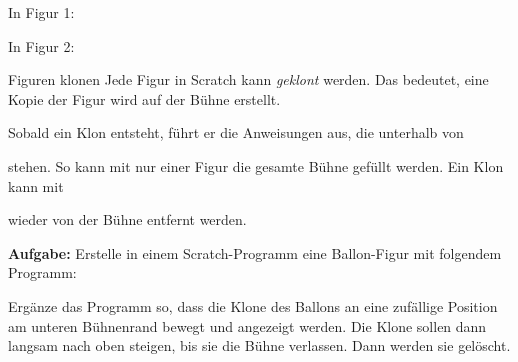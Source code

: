 \documentclass[lerntheke,12pt,a5paper,landscape]{arbeitsblatt}
\newenvironment{inlinescratch}{\begin{scratch}[scale=0.6]}{\end{scratch}}
\begin{document}
\begin{loesungskarte}
	\begin{multicols}{2}
		In Figur 1:

		\begin{scratch}[scale=0.7]
		\end{scratch}

		\begin{scratch}[scale=0.7]
		\end{scratch}
		\columnbreak

		In Figur 2:

		\begin{scratch}[scale=0.7]
		\end{scratch}

		\begin{scratch}[scale=0.7]
		\end{scratch}
	\end{multicols}
\end{loesungskarte}

\begin{karte2}{Figuren klonen}
Jede Figur in Scratch kann \emph{geklont} werden. Das bedeutet, eine Kopie der Figur wird auf der Bühne erstellt.

Sobald ein Klon entsteht, führt er die Anweisungen aus, die unterhalb von \begin{inlinescratch}\end{inlinescratch} stehen. So kann mit nur einer Figur die gesamte Bühne gefüllt werden. Ein Klon kann mit \begin{inlinescratch}\end{inlinescratch} wieder von der Bühne entfernt werden.

\textbf{Aufgabe:} Erstelle in einem Scratch-Programm eine Ballon-Figur mit folgendem Programm:

\begin{scratch}[scale=0.7]
\end{scratch}
\smallskip

Ergänze das Programm so, dass die Klone des Ballons an eine zufällige Position am unteren Bühnenrand bewegt und angezeigt werden. Die Klone sollen dann langsam nach oben steigen, bis sie die Bühne verlassen. Dann werden sie gelöscht.
\end{karte2}
\end{document}

